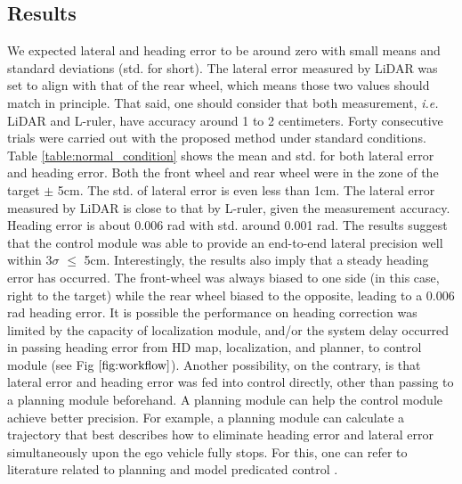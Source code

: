 \documentclass[letterpaper, 10 pt, conference]{ieeeconf}
\begin{document}
\subsection{Results}
We expected lateral and heading error to be around zero with small means and standard deviations (std. for short). The lateral error measured by LiDAR was set to align with that of the rear wheel, which means those two values should match in principle. 
That said, one should consider that both measurement, \textit{i.e.} LiDAR and L-ruler, have accuracy around 1 to 2 centimeters. Forty consecutive trials were carried out with the proposed method under standard conditions. 
Table \ref{table:normal_condition} shows the mean and std. for both lateral error and heading error. Both the front wheel and rear wheel were in the zone of the target $\pm$ 5cm. 
The std. of lateral error is even less than 1cm. The lateral error measured by LiDAR is close to that by L-ruler, given the measurement accuracy. Heading error is about 0.006 rad with std. around 0.001 rad. 
The results suggest that the control module was able to provide an end-to-end lateral precision well within 3$\sigma$ $\leq$ 5cm. Interestingly, the results also imply that a steady heading error has occurred. The front-wheel was always biased to one side (in this case, right to the target) while the rear wheel biased to the opposite, leading to a 0.006 rad heading error. It is possible the performance on heading correction was limited by the capacity of localization module, and/or the system delay occurred in passing heading error from HD map, localization, and planner, to control module (see Fig $\ref{fig:workflow}$).
Another possibility, on the contrary, is that lateral error and heading error was fed into control directly, other than passing to a planning module beforehand. 
A planning module can help the control module achieve better precision. For example, a planning module can calculate a trajectory that best describes how to eliminate heading error and lateral error simultaneously upon the ego vehicle fully stops.
For this, one can refer to literature related to planning and model predicated control \cite{Pannocchia2010Disturbance, Afram2014Theory}. 
\end{document}
